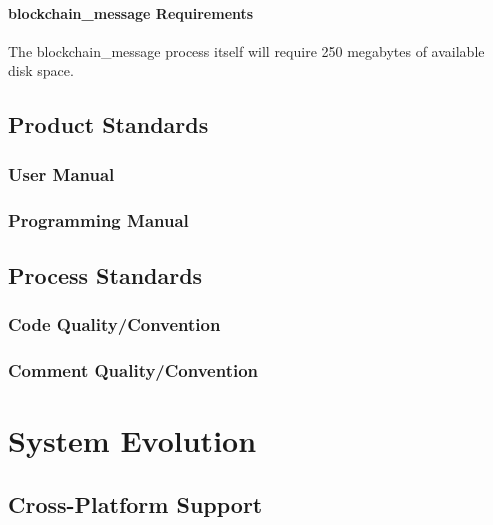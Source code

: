 \documentclass[titlepage]{report}
\begin{document}
\paragraph{blockchain\_message Requirements}
The blockchain\_message process itself will require 250 megabytes of available disk space.

\subsection{Product Standards}
\subsubsection{User Manual}
\subsubsection{Programming Manual}

\subsection{Process Standards}
\subsubsection{Code Quality/Convention}
\subsubsection{Comment Quality/Convention}

\section{System Evolution}
\subsection{Cross-Platform Support}

\printindex
\printglossaries{}
\printbibliography{}
\end{document}
